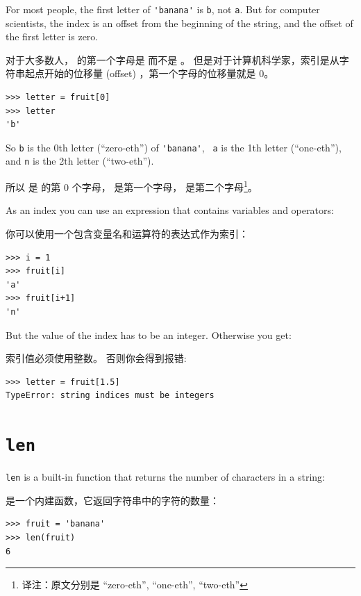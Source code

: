 %
For most people, the first letter of \verb"'banana'" is {\tt b}, not
{\tt a}.  But for computer scientists, the index is an offset from the
beginning of the string, and the offset of the first letter is zero.

对于大多数人， 的第一个字母是  而不是 。
但是对于计算机科学家，索引是从字符串起点开始的位移量 (offset) ，第一个字母的位移量就是 0。

\begin{lstlisting}
>>> letter = fruit[0]
>>> letter
'b'
\end{lstlisting}

%
So {\tt b} is the 0th letter (``zero-eth'') of \verb"'banana'", {\tt
  a} is the 1th letter (``one-eth''), and {\tt n} is the 2th letter
(``two-eth'').   

所以  是  的第 $0$ 个字母，  是第一个字母，  是第二个字母\footnote{译注：原文分别是 ``zero-eth'', ``one-eth'', ``two-eth''}。

As an index you can use an expression that contains variables and
operators:

你可以使用一个包含变量名和运算符的表达式作为索引：

\begin{lstlisting}
>>> i = 1
>>> fruit[i]
'a'
>>> fruit[i+1]
'n'
\end{lstlisting}

%

But the value of the index has to be an integer.  Otherwise you
get:
  

索引值必须使用整数。 否则你会得到报错:

\begin{lstlisting}
>>> letter = fruit[1.5]
TypeError: string indices must be integers
\end{lstlisting}


%
\section{{\tt len}}
  

{\tt len} is a built-in function that returns the number of characters
in a string:

 是一个内建函数，它返回字符串中的字符的数量：

\begin{lstlisting}
>>> fruit = 'banana'
>>> len(fruit)
6
\end{lstlisting}

